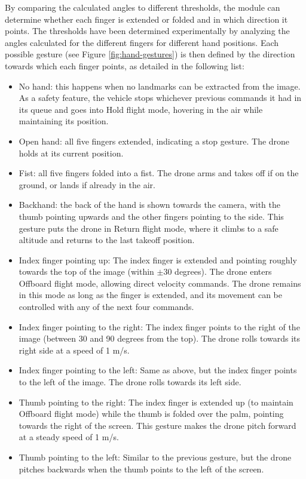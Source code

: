 By comparing the calculated angles to different thresholds, the module can determine whether each finger is extended or folded and in which direction it points. The thresholds have been determined experimentally by analyzing the angles calculated for the different fingers for different hand positions. Each possible gesture (see Figure \ref{fig:hand-gestures}) is then defined by the direction towards which each finger points, as detailed in the following list:
\begin{itemize}
    \item No hand: this happens when no landmarks can be extracted from the image. As a safety feature, the vehicle stops whichever previous commands it had in its queue and goes into Hold flight mode, hovering in the air while maintaining its position.
    \item Open hand: all five fingers extended, indicating a stop gesture. The drone holds at its current position.
    \item Fist: all five fingers folded into a fist. The drone arms and takes off if on the ground, or lands if already in the air.
    \item Backhand: the back of the hand is shown towards the camera, with the thumb pointing upwards and the other fingers pointing to the side. This gesture puts the drone in Return flight mode, where it climbs to a safe altitude and returns to the last takeoff position.
    \item Index finger pointing up: The index finger is extended and pointing roughly towards the top of the image (within $\pm$30 degrees). The drone enters Offboard flight mode, allowing direct velocity commands. The drone remains in this mode as long as the finger is extended, and its movement can be controlled with any of the next four commands.
    \item Index finger pointing to the right: The index finger points to the right of the image (between 30 and 90 degrees from the top). The drone rolls towards its right side at a speed of 1 m/s.
    \item Index finger pointing to the left: Same as above, but the index finger points to the left of the image. The drone rolls towards its left side.
    \item Thumb pointing to the right: The index finger is extended up (to maintain Offboard flight mode) while the thumb is folded over the palm, pointing towards the right of the screen. This gesture makes the drone pitch forward at a steady speed of 1 m/s.
    \item Thumb pointing to the left: Similar to the previous gesture, but the drone pitches backwards when the thumb points to the left of the screen.
\end{itemize}




